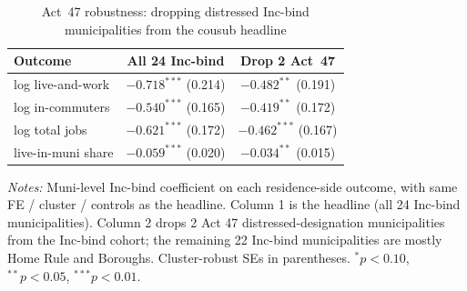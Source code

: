 \begin{table}[H]
  \centering
  \caption{Act~47 robustness: dropping distressed Inc-bind municipalities from the cousub headline}
  \label{tab:act47_robustness}
  \small
  \begin{tabular}{lcc}
    \toprule
    Outcome & All 24 Inc-bind & Drop 2 Act~47 \\
    \midrule
    log live-and-work & $-0.718^{***}$ (0.214) & $-0.482^{**}$ (0.191) \\
    log in-commuters & $-0.540^{***}$ (0.165) & $-0.419^{**}$ (0.172) \\
    log total jobs & $-0.621^{***}$ (0.172) & $-0.462^{***}$ (0.167) \\
    live-in-muni share & $-0.059^{***}$ (0.020) & $-0.034^{**}$ (0.015) \\
    \bottomrule
  \end{tabular}
  \vspace{0.3em}
  \begin{minipage}{0.85\textwidth}
    \footnotesize \textit{Notes:} Muni-level Inc-bind coefficient on each residence-side outcome, with same FE / cluster / controls as the headline. Column 1 is the headline (all 24 Inc-bind municipalities). Column 2 drops 2 Act 47 distressed-designation municipalities from the Inc-bind cohort; the remaining 22 Inc-bind municipalities are mostly Home Rule and Boroughs. Cluster-robust SEs in parentheses. $^{*}p<0.10$, $^{**}p<0.05$, $^{***}p<0.01$.
  \end{minipage}
\end{table}

